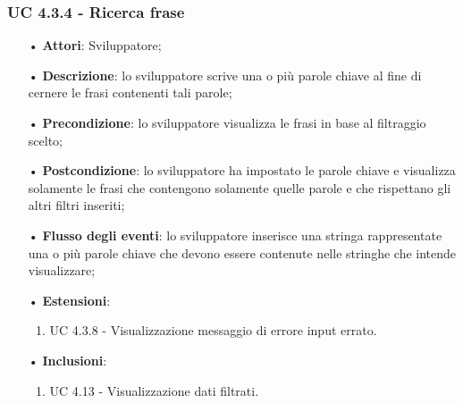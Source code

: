 \subsubsection{UC 4.3.4 - Ricerca frase}
\begin{itemize}
	\item[•]\textbf{Attori}: Sviluppatore;
	\item[•]\textbf{Descrizione}: lo sviluppatore scrive una o più parole chiave al fine di cernere le frasi contenenti tali parole;
	\item[•]\textbf{Precondizione}: lo sviluppatore visualizza le frasi in base al filtraggio scelto;
	\item[•]\textbf{Postcondizione}: lo sviluppatore ha impostato le parole chiave e visualizza solamente le frasi che contengono solamente quelle parole e che rispettano gli altri filtri inseriti;
	\item[•]\textbf{Flusso degli eventi}: lo sviluppatore inserisce una stringa rappresentate una o più parole chiave che devono essere contenute nelle stringhe che intende visualizzare;
	\item[•]\textbf{Estensioni}: 
	\begin{enumerate}
		\item UC 4.3.8 - Visualizzazione messaggio di errore input errato.
	\end{enumerate}
	\item[•]\textbf{Inclusioni}:
	\begin{enumerate}
		\item UC 4.13 - Visualizzazione dati filtrati.
	\end{enumerate}
\end{itemize}

